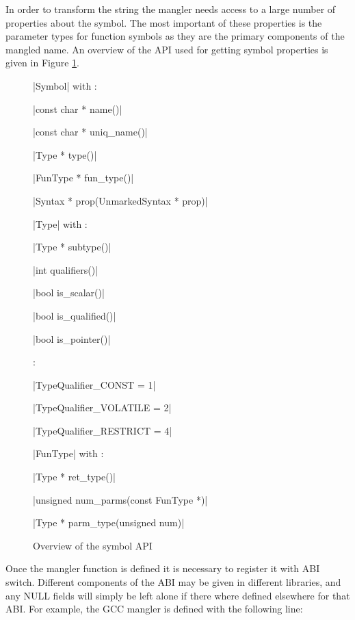 In order to transform the string the mangler needs access to a large
number of properties about the symbol.  The most important of these
properties is the parameter types for function symbols as they are the
primary components of the mangled name.  An overview of the API used
for getting symbol properties is given in Figure \ref{symbol-api}.

\begin{figure}
\begin{apil}
\item {} |Symbol| with :
\begin{apill}
\item |const char * name()|
\item |const char * uniq_name()|
\item |Type * type()|
\item |FunType * fun_type()|
\item |Syntax * prop(UnmarkedSyntax * prop)|
\end{apill}
\item {} |Type| with :
\begin{apill}
\item |Type * subtype()|
\item |int qualifiers()|
\item |bool is_scalar()|
\item |bool is_qualified()|
\item |bool is_pointer()|
\end{apill}
\item {}:
\begin{apill}
\item |TypeQualifier_CONST    = 1|
\item |TypeQualifier_VOLATILE = 2|
\item |TypeQualifier_RESTRICT = 4|
\end{apill}
\item {} |FunType| with :
\begin{apill}
\item |Type * ret_type()|
\item |unsigned num_parms(const FunType *)|
\item |Type * parm_type(unsigned num)|
\end{apill}
\end{apil}
\caption{Overview of the symbol API}
\label{symbol-api}
\end{figure}

Once the mangler function is defined it is necessary to register it
with ABI switch.  Different components of the ABI may be given in
different libraries, and any NULL fields will simply be left alone if there
where defined elsewhere for that ABI.  For example, the GCC mangler is
defined with the following line:

